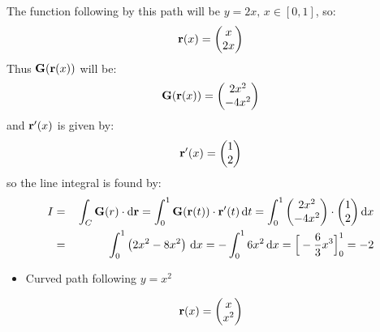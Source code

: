 \documentclass[letterpaper,10pt,english]{jupyterBook}
\begin{document}
\sphinxAtStartPar
The function following by this path will be \(y = 2x,\, x \in [0, 1]\), so:
\begin{equation*}
\begin{split}{\bf r}(x) = \begin{pmatrix} x \\ 2x \end{pmatrix}\end{split}
\end{equation*}
\sphinxAtStartPar
Thus \({\bf G}({\bf r}(x))\) will be:
\begin{equation*}
\begin{split}{\bf G}({\bf r}(x)) = \begin{pmatrix} 2x^2 \\ -4x^2 \end{pmatrix}\end{split}
\end{equation*}
\sphinxAtStartPar
and \({\bf r'}(x)\) is given by:
\begin{equation*}
\begin{split}{\bf r}'(x) = \begin{pmatrix} 1 \\ 2 \end{pmatrix}\end{split}
\end{equation*}
\sphinxAtStartPar
so the line integral is found by:
\begin{equation*}
\begin{split}I &=&\, \int_C {\bf G}(r) \cdot \mathrm{d}{\bf r} = \int_0^1 {\bf G}({\bf r}(t)) \cdot {\bf r}'(t)\,\mathrm{d}t = 
\int_0^1 \begin{pmatrix} 2x^2 \\ -4x^2 \end{pmatrix} \cdot \begin{pmatrix} 1 \\ 2 \end{pmatrix} \mathrm{d}x \\
&=&\, \int_0^1 \left( 2x^2 - 8x^2 \right)\,\textrm{d}x = -\int_0^1 6x^2 \,\textrm{d}x = \Big[ -\frac{6}{3}x^3\Big ]_0^1 = -2\end{split}
\end{equation*}\begin{itemize}
\item {} 
\sphinxAtStartPar
Curved path following \(y = x^2\)

\end{itemize}
\begin{equation*}
\begin{split}{\bf r}(x) = \begin{pmatrix} x \\ x^2 \end{pmatrix}\end{split}
\end{equation*}
\end{document}
